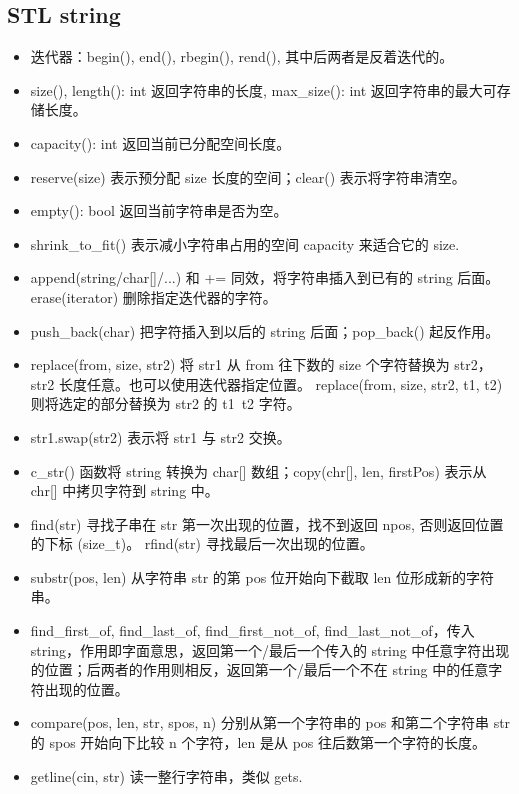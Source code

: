 \subsection{STL string}
\begin{itemize}
	\item 迭代器：begin(), end(), rbegin(), rend(), 其中后两者是反着迭代的。
	\item size(), length(): int 返回字符串的长度, max\_size(): int 返回字符串的最大可存储长度。
	\item capacity(): int 返回当前已分配空间长度。
	\item reserve(size) 表示预分配 size 长度的空间；clear() 表示将字符串清空。
	\item empty(): bool 返回当前字符串是否为空。
	\item shrink\_to\_fit() 表示减小字符串占用的空间 capacity 来适合它的 size.
	\item append(string/char[]/...) 和 += 同效，将字符串插入到已有的 string 后面。erase(iterator) 删除指定迭代器的字符。
	\item push\_back(char) 把字符插入到以后的 string 后面；pop\_back() 起反作用。
	\item replace(from, size, str2) 将 str1 从 from 往下数的 size 个字符替换为 str2，str2 长度任意。也可以使用迭代器指定位置。 replace(from, size, str2, t1, t2)  则将选定的部分替换为 str2 的 t1~t2 字符。
	\item str1.swap(str2) 表示将 str1 与 str2 交换。
	\item c\_str() 函数将 string 转换为 char[] 数组；copy(chr[], len, firstPos) 表示从 chr[] 中拷贝字符到 string 中。
	\item find(str) 寻找子串在 str 第一次出现的位置，找不到返回 npos, 否则返回位置的下标 (size\_t)。 rfind(str) 寻找最后一次出现的位置。
	\item substr(pos, len) 从字符串 str 的第 pos 位开始向下截取 len 位形成新的字符串。
	\item find\_first\_of, find\_last\_of, find\_first\_not\_of, find\_last\_not\_of，传入 string，作用即字面意思，返回第一个/最后一个传入的 string 中任意字符出现的位置；后两者的作用则相反，返回第一个/最后一个不在 string 中的任意字符出现的位置。
	\item compare(pos, len, str, spos, n) 分别从第一个字符串的 pos 和第二个字符串 str 的 spos 开始向下比较 n 个字符，len 是从 pos 往后数第一个字符的长度。
	\item getline(cin, str) 读一整行字符串，类似 gets.
\end{itemize}